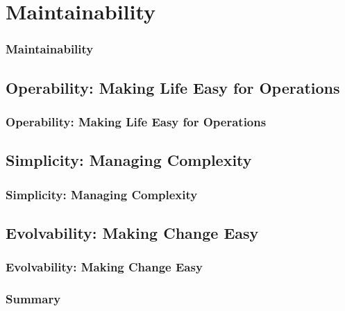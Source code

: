 \documentclass{beamer}
\begin{document}
\section{Maintainability}
\begin{frame}\frametitle{Maintainability}
\end{frame}

\subsection{Operability: Making Life Easy for Operations}
\begin{frame}\frametitle{Operability: Making Life Easy for Operations}
\end{frame}

\subsection{Simplicity: Managing Complexity}
\begin{frame}\frametitle{Simplicity: Managing Complexity}
\end{frame}

\subsection{Evolvability: Making Change Easy}
\begin{frame}\frametitle{Evolvability: Making Change Easy}
\end{frame}

\begin{frame}\frametitle{Summary}
\end{frame}
\end{document}
